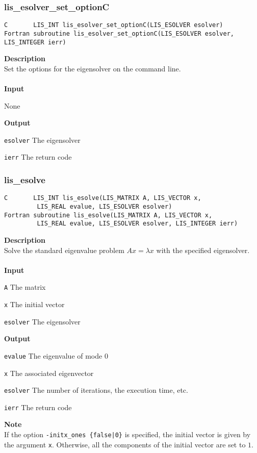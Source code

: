 \documentclass[a4paper]{article}
\newcommand{\namelistlabel}[1]{\mbox{#1}\hfill}
\newenvironment{namelist}[1]{%
\begin{list}{}
  {\let\makelabel\namelistlabel
  \settowidth{\labelwidth}{#1}
  \setlength{\leftmargin}{1.1\labelwidth}}
  }{%
\end{list}}
\begin{document}
\newpage
\subsubsection{lis\_esolver\_set\_optionC}
\begin{screen}
\verb|C       LIS_INT lis_esolver_set_optionC(LIS_ESOLVER esolver)|\\
\verb|Fortran subroutine lis_esolver_set_optionC(LIS_ESOLVER esolver, LIS_INTEGER ierr)|
\end{screen}
{\bf Description}\\
\indent
Set the options for the eigensolver on the command line.
\\ \\
\noindent
{\bf Input}
\begin{namelist}{XXXXXXXXXXXXXXXXXXXX}
\item[None]
\end{namelist}
{\bf Output}
\begin{namelist}{XXXXXXXXXXXXXXXXXXXX}
\item[\tt esolver] The eigensolver
\item[\tt ierr] The return code
\end{namelist}

\subsubsection{lis\_esolve}
\begin{screen}
\verb|C       LIS_INT lis_esolve(LIS_MATRIX A, LIS_VECTOR x,|\\ 
\verb|         LIS_REAL evalue, LIS_ESOLVER esolver)|\\
\verb|Fortran subroutine lis_esolve(LIS_MATRIX A, LIS_VECTOR x,|\\
\verb|         LIS_REAL evalue, LIS_ESOLVER esolver, LIS_INTEGER ierr)|
\end{screen}
{\bf Description}\\
\indent
Solve the standard eigenvalue problem $Ax = \lambda x$ with the specified eigensolver.
\\ \\
\noindent
{\bf Input}
\begin{namelist}{XXXXXXXXXXXXXXXXXXXX}
\item[\tt A] The matrix
\item[\tt x] The initial vector
\item[\tt esolver] The eigensolver
\end{namelist}
{\bf Output}
\begin{namelist}{XXXXXXXXXXXXXXXXXXXX}
\item[\tt evalue] The eigenvalue of mode 0
\item[\tt x] The associated eigenvector
\item[\tt esolver] The number of iterations, the execution time, etc.
\item[\tt ierr] The return code
\end{namelist}
{\bf Note}\\
\indent
If the option {\tt -initx\_ones \{false|0\}} is specified, the initial
vector is given by the argument {\tt x}.
Otherwise, all the components of the initial vector are set to $1$. 
\end{document}
